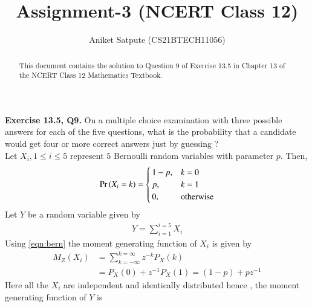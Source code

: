 \documentclass[journal,12pt,twocolumn]{IEEEtran}
\begin{document}
\makeatletter
{}
\makeatother
\let\StandardTheFigure\thefigure
\let\vec\mathbf
\renewcommand{\thefigure}{\arabic{figure}}
\def\putbox#1#2#3{\makebox[0in][l]{\makebox[#1][l]{}\raisebox{\baselineskip}[0in][0in]{\raisebox{#2}[0in][0in]{#3}}}}
     \def\rightbox#1{\makebox[0in][r]{#1}}
     \def\centbox#1{\makebox[0in]{#1}}
     \def\topbox#1{\raisebox{-\baselineskip}[0in][0in]{#1}}
     \def\midbox#1{\raisebox{-0.5\baselineskip}[0in][0in]{#1}}
\vspace{3cm}
\title{Assignment-3 (NCERT Class 12)}
\author{Aniket Satpute (CS21BTECH11056)}	
\maketitle
\begin{abstract}
This document contains the solution to Question 9 of Exercise 13.5 in Chapter 13  of the NCERT Class 12 Mathematics Textbook.
\end{abstract}
\noindent \textbf{Exercise 13.5, Q9.} On a multiple choice examination with three possible answers for each of the five questions, what is the probability that a candidate would get four or more correct answers just by guessing ?\\
\solution Let $X_{i}, 1 \leq i \leq 5$ represent $5$ Bernoulli random variables with parameter $p$. Then,
\begin{align}
\Pr\left(X_i = k\right) = 
\begin{cases}
1 - p, & k = 0 \\
p, & k = 1 \\
0, & \textrm{otherwise}
\end{cases}
\label{eqn:bern}
\end{align}
\noindent Let $Y$ be a random variable given by 
\begin{align}
Y = \sum_{i = 1}^{i = 5}X_i
\label{eqn:Y}
\end{align}
\noindent Using \autoref{eqn:bern} the moment generating function of $X_i$ is given by
\begin{align}
M_Z(X_i) &= \sum_{k = -\infty}^{k = \infty}z^{-k}P_X(k) \\
&= P_X(0) + z^{-1}P_X(1) = (1 - p) + pz^{-1}
\end{align}
Here all the $X_i$ are independent and identically distributed hence , the moment generating function of $Y$ is
\end{document}
